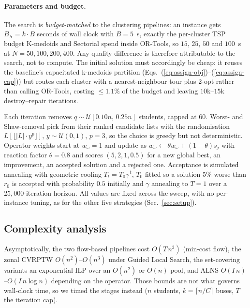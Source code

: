 \documentclass[graybox]{SNmult}
\begin{document}
\paragraph{Parameters and budget.}
The search is \emph{budget-matched} to the clustering pipelines: an
instance gets $B_{\mathrm{A}}=k\cdot B$ seconds of wall clock with
$B=5$~s, exactly the per-cluster TSP budget K-medoids and Sectorial spend
inside OR-Tools, so $15$, $25$, $50$ and $100$~s at $N=50,100,200,400$.
Any quality difference is therefore attributable to the search, not to
compute. The initial solution must accordingly be cheap: it reuses the
baseline's capacitated k-medoids partition
(Eqs.~(\ref{eq:assign-obj})--(\ref{eq:assign-cap})) but routes each
cluster with a nearest-neighbour tour plus 2-opt rather than calling
OR-Tools, costing $\le1.1\%$ of the budget and leaving $10$k--$15$k
destroy--repair iterations.

Each iteration removes $q\sim\mathcal{U}[0.10n,\,0.25n]$ students, capped
at $60$. Worst- and Shaw-removal pick from their ranked candidate lists
with the randomisation $L[\lfloor |L|\cdot y^{p}\rfloor]$,
$y\sim\mathcal{U}(0,1)$, $p=3$, so the choice is greedy but not
deterministic. Operator weights start at $w_\omega=1$ and update as
$w_\omega \gets \theta w_\omega + (1-\theta)s_j$ with reaction factor
$\theta=0.8$ and scores $(5,2,1,0.5)$ for a new global best, an
improvement, an accepted solution and a rejected one. Acceptance is
simulated annealing with geometric cooling $T_t=T_0\gamma^{\,t}$, $T_0$
fitted so a solution $5\%$ worse than $r_0$ is accepted with probability
$0.5$ initially and $\gamma$ annealing to $T=1$ over a $25{,}000$-iteration
horizon. All values are fixed across the sweep, with no per-instance
tuning, as for the other five strategies (Sec.~\ref{sec:setup}).

\subsection{Complexity analysis}\label{sec:complexity}
Asymptotically, the two flow-based pipelines cost $O(T\,n^3)$ (min-cost
flow), the zonal CVRPTW $O(n^2)$--$O(n^3)$ under Guided Local Search, the
set-covering variants an exponential ILP over an $O(n^2)$ or $O(n)$ pool,
and ALNS $O(I\,n)$--$O(I\,n\log n)$ depending on the operator. Those
bounds are not what governs wall-clock time, so we timed the stages
instead ($n$ students, $k=\lceil n/C\rceil$ buses, $T$ the iteration cap).
\end{document}
